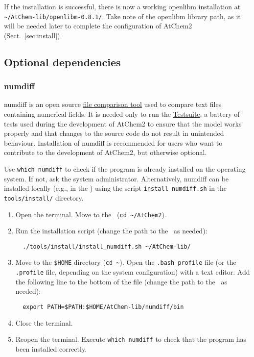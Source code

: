 If the installation is successful, there is now a working openlibm
installation at \texttt{\textasciitilde/AtChem-lib/openlibm-0.8.1/}.
Take note of the openlibm library path, as it will be needed later to
complete the configuration of AtChem2 (Sect.~\ref{sec:install}).

\subsection{Optional dependencies} \label{subsec:optional-dependencies}

\subsubsection{numdiff}

numdiff is an open source \href{https://www.nongnu.org/numdiff}{file comparison tool}
used to compare text files containing numerical fields. It is needed only
to run the \hyperref[sec:test-suite]{Testsuite}, a battery of tests
used during the development of AtChem2 to ensure that the model works
properly and that changes to the source code do not result in
unintended behaviour. Installation of numdiff is recommended for users
who want to contribute to the development of AtChem2, but otherwise
optional.

Use \verb|which numdiff| to check if the program is already installed
on the operating system. If not, ask the system administrator.
Alternatively, numdiff can be installed locally (e.g., in the \depdir)
using the script \texttt{install\_numdiff.sh} in the
\texttt{tools/install/} directory.

\begin{enumerate}
\item Open the terminal. Move to the \maindir\ (\verb|cd ~/AtChem2|).
\item Run the installation script (change the path to the \depdir\ as
  needed):
  \begin{verbatim}
  ./tools/install/install_numdiff.sh ~/AtChem-lib/
  \end{verbatim}
\item Move to the \texttt{\$HOME} directory (\texttt{cd\ \textasciitilde}).
  Open the \texttt{.bash\_profile} file (or the \texttt{.profile}
  file, depending on the system configuration) with a text editor. Add the
  following line to the bottom of the file (change the path to the
  \depdir\ as needed):
  \begin{verbatim}
  export PATH=$PATH:$HOME/AtChem-lib/numdiff/bin
  \end{verbatim}
\item Close the terminal.
\item Reopen the terminal. Execute \verb|which numdiff| to check that
  the program has been installed correctly.
\end{enumerate}

